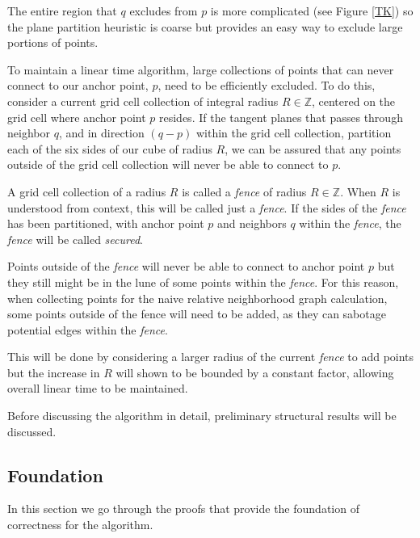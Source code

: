 \documentclass[a4paper,fleqn]{cas-dc}
\begin{document}
The entire region that $q$ excludes from $p$ is more complicated (see Figure \ref{TK})
so the plane partition heuristic is coarse but provides an
easy way to exclude large portions of points.

To maintain a linear time algorithm, 
large collections of points that can never connect to our anchor point, $p$, need to be
efficiently excluded.
To do this, consider a current grid cell collection of integral radius $R \in \mathbb{Z}$, centered
on the grid cell where anchor point $p$ resides.
If the tangent planes that passes through neighbor $q$, and in direction $(q-p)$ within the grid cell collection,
partition each of the six sides of our cube of radius $R$, we can be assured that any points outside
of the grid cell collection will never be able to connect to $p$.

A grid cell collection of a radius $R$ is called a \emph{fence} of radius $R \in \mathbb{Z}$.
When $R$ is understood from context, this will be called just a \emph{fence}.
If the sides of the \emph{fence} has been partitioned, with anchor point $p$ and neighbors $q$ within
the \emph{fence}, the \emph{fence} will be called \emph{secured}.

Points outside of the \emph{fence} will never be able to connect to anchor point $p$ but they still
might be in the lune of some points within the \emph{fence}.
For this reason, when collecting points for the naive relative neighborhood graph calculation, some
points outside of the fence will need to be added, as they can sabotage potential edges within
the \emph{fence}.

This will be done by considering a larger radius of the current \emph{fence} to add points
but the increase in $R$ will shown to be bounded by a constant factor, allowing overall linear time to be maintained.

Before discussing the algorithm in detail, preliminary structural results will be discussed.

\subsection{Foundation}

In this section we go through the proofs that provide the foundation of correctness
for the algorithm.
\end{document}
